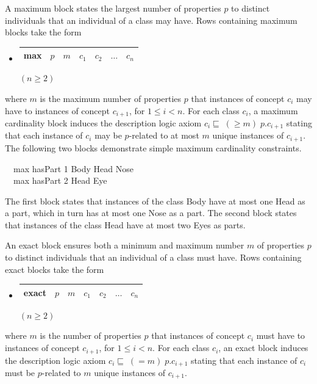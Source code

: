 \documentclass[preprint,number]{elsarticle}
\begin{document}
A maximum block states the largest number of properties $p$ to
distinct individuals that an individual of a class may have.  Rows
containing maximum blocks take the form
\begin{itemize}
\item[]
  \begin{tabular}{|l|l|l|l|l|l|l|}\hline \textsf{max} & $p$ & $m$ & 
    $c_1$ & $c_2$ & $\dots$ & $c_n$
    \\ \hline
  \end{tabular} \hfill $(n \ge 2)$
\end{itemize}
where $m$ is the maximum number of properties $p$ that instances of
concept $c_i$ may have to instances of concept $c_{i+1}$, for $1 \le i
< n$.  For each class $c_i$, a maximum cardinality block induces the
description logic axiom $c_i \sqsubseteq \; (\ge m) \; p.c_{i+1}$
stating that each instance of $c_i$ may be $p$-related to at most $m$
unique instances of $c_{i+1}$. The following two blocks demonstrate
simple maximum cardinality constraints.
\begin{tabbing}
  ~~\textsf{max} \textsf{hasPart} 1 \textsf{Body} \textsf{Head} 
  \textsf{Nose} \\
  ~~\textsf{max} \textsf{hasPart} 2 \textsf{Head} \textsf{Eye}
\end{tabbing}
The first block states that instances of the class Body have at most
one Head as a part, which in turn has at most one Nose as a part. The
second block states that instances of the class Head have at most two
Eyes as parts. 

An exact block ensures both a minimum and maximum number $m$ of
properties $p$ to distinct individuals that an individual of a class
must have. Rows containing exact blocks take the form
\begin{itemize}
\item[]
  \begin{tabular}{|l|l|l|l|l|l|l|}\hline \textsf{exact} & $p$ & $m$ & 
    $c_1$ & $c_2$ & $\dots$ & $c_n$
    \\ \hline
  \end{tabular} \hfill $(n \ge 2)$
\end{itemize}
where $m$ is the number of properties $p$ that instances of concept
$c_i$ must have to instances of concept $c_{i+1}$, for $1 \le i < n$.
For each class $c_i$, an exact block induces the description logic
axiom $c_i \sqsubseteq \; (= m) \; p.c_{i+1}$ stating that each
instance of $c_i$ must be $p$-related to $m$ unique instances of
$c_{i+1}$.
\end{document}
